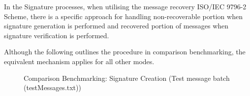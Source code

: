 \documentclass[]{final_report}
\begin{document}
In the Signature processes, when utilising the message recovery ISO/IEC 9796-2 Scheme, there is a specific approach for handling non-recoverable portion when signature generation is performed and recovered portion of messages when signature verification is performed. 

Although the following outlines the procedure in comparison benchmarking, the equivalent mechanism applies for all other modes.
\begin{figure}[H]
    \centering %
    
    \begin{minipage}{0.2\textwidth}
        \centering
       \caption{Comparison Benchmarking: Signature Creation (Test message batch (testMessages.txt))}


\end{minipage}
\end{figure}
\end{document}
